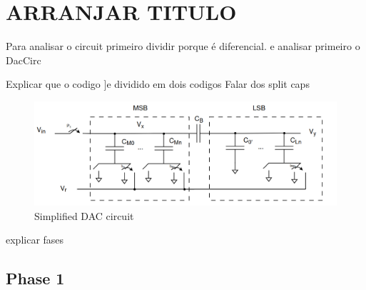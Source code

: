 \section{ARRANJAR TITULO}

Para analisar o circuit primeiro dividir porque é diferencial. e analisar primeiro o DacCirc

Explicar que o codigo ]e dividido em dois codigos
Falar dos split caps

\begin{figure}[H]
    \centering
    \includegraphics*[scale = 0.35]{Images/DacCirc.png}
    \caption{Simplified DAC circuit}
    \label{fig:DAC_Circ}
\end{figure}

explicar fases

\subsection{Phase 1}

